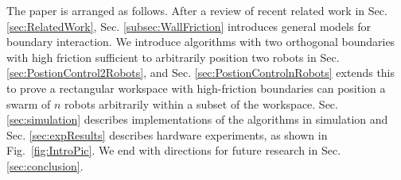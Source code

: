 The paper is arranged as follows. 
After a review of recent related work in Sec.  \ref{sec:RelatedWork},
  Sec.  \ref{subsec:WallFriction} introduces general models for boundary interaction.  We introduce algorithms with two orthogonal boundaries with high friction sufficient to arbitrarily position two robots in Sec.  \ref{sec:PostionControl2Robots}, and Sec.  \ref{sec:PostionControlnRobots} extends this to prove a rectangular workspace with high-friction boundaries can position a swarm of $n$ robots arbitrarily within a subset of the workspace.
Sec.  \ref{sec:simulation} describes implementations of the algorithms in simulation and  Sec.  \ref{sec:expResults} describes hardware experiments, as shown in Fig.~\ref{fig:IntroPic}.  We end with directions for future research in Sec.  \ref{sec:conclusion}.
